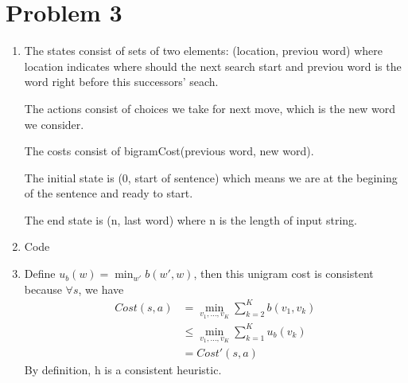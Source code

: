 \documentclass[12pt]{article}
\begin{document}
\section*{Problem 3}

\begin{enumerate}[label=(\alph*)]
  \item The states consist of sets of two elements: (location, previou word) where
location indicates where should the next search start and previou word is the
word right before this successors' seach.

The actions consist of choices we take for next move, which is the new word we
consider.

The costs consist of bigramCost(previous word, new word).

The initial state is (0, start of sentence) which means we are at the begining
of the sentence and ready to start.

The end state is (n, last word) where n is the length of input string.

\item Code

\item Define $u_b(w) = \min_{w'} b(w', w)$, then this unigram cost is consistent
because $\forall s$, we have
\begin{align*}
Cost(s, a) &= \min_{v_1,...,v_K}\sum^K_{k = 2} b(v_1, v_k)\\
& \leq \min_{v_1,...,v_K}\sum^K_{k = 1} u_b(v_k)\\
& = Cost'(s,a)
\end{align*}
By definition, h is a consistent heuristic.
\end{enumerate}
\end{document}

